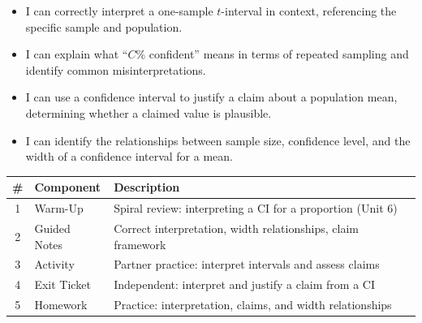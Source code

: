 \documentclass[10pt]{article}
\begin{document}

\vspace{2.4cm}
\namedateperiod

\begin{learningtargetbox}
\begin{itemize}
    \item I can correctly interpret a one-sample $t$-interval in context, referencing
          the specific sample and population.
    \item I can explain what ``$C$\% confident'' means in terms of repeated sampling and
          identify common misinterpretations.
    \item I can use a confidence interval to justify a claim about a population mean,
          determining whether a claimed value is plausible.
    \item I can identify the relationships between sample size, confidence level, and
          the width of a confidence interval for a mean.
\end{itemize}
\end{learningtargetbox}

\begin{tocbox}
\renewcommand{\arraystretch}{1.5}
\begin{tabularx}{\linewidth}{clX}
    \textbf{\#} & \textbf{Component} & \textbf{Description} \\
    \hline
    1 & Warm-Up      & Spiral review: interpreting a CI for a proportion (Unit 6) \\
    2 & Guided Notes & Correct interpretation, width relationships, claim framework \\
    3 & Activity     & Partner practice: interpret intervals and assess claims \\
    4 & Exit Ticket  & Independent: interpret and justify a claim from a CI \\
    5 & Homework     & Practice: interpretation, claims, and width relationships \\
\end{tabularx}
\end{tocbox}
\end{document}
